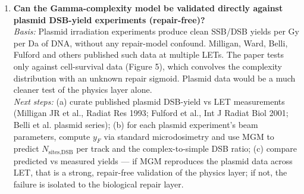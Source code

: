 \begin{enumerate}
\item \textbf{Can the Gamma-complexity model be validated directly against
plasmid DSB-yield experiments (repair-free)?} \\
\emph{Basis:} Plasmid irradiation experiments produce clean SSB/DSB yields
per Gy per Da of DNA, without any repair-model confound. Milligan, Ward,
Belli, Fulford and others published such data at multiple LETs. The paper
tests only against cell-survival data (Figure 5), which convolves the
complexity distribution with an unknown repair sigmoid. Plasmid data would
be a much cleaner test of the physics layer alone. \\
\emph{Next steps:} (a) curate published plasmid DSB-yield vs LET
measurements (Milligan JR et al., Radiat Res 1993; Fulford et al.,
Int J Radiat Biol 2001; Belli et al. plasmid series); (b) for each
plasmid experiment's beam parameters, compute $y_F$ via standard
microdosimetry and use MGM to predict $N_{\text{sites,DSB}}$ per track and
the complex-to-simple DSB ratio; (c) compare predicted vs measured yields ---
if MGM reproduces the plasmid data across LET, that is a strong, repair-free
validation of the physics layer; if not, the failure is isolated to the
biological repair layer.

\end{enumerate}
